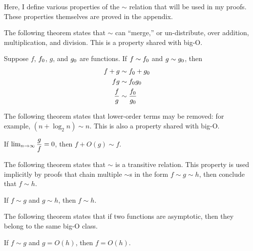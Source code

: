 Here, I define various properties of the $\sim$ relation that will be used in my proofs. These properties themselves are proved in the appendix.

The following theorem states that $\sim$ can ``merge,'' or un-distribute, over addition, multiplication, and division. This is a property shared with big-O.

\begin{theorem}
\label{thm:MergesOverOps}
	Suppose $f$, $f_0$, $g$, and $g_0$ are functions. If $f \sim f_0$ and $g \sim g_0$, then
	\begin{align*}
	f + g &\sim f_0 + g_0\\
	fg &\sim f_0g_0\\
	\frac{f}{g} &\sim \frac {f_0} {g_0}
	\end{align*}
\end{theorem}

The following theorem states that lower-order terms may be removed: for example, $(n + \log_2 n) \sim n$. This is also a property shared with big-O.

\begin{theorem}
\label{thm:RemovesLowerOrderTerms}
	If $\lim_{n \to \infty} \dfrac{g}{f} = 0$, then $f + O(g) \sim f$.
\end{theorem}

The following theorem states that $\sim$ is a transitive relation. This property is used implicitly by proofs that chain multiple $\sim$s in the form $f \sim g \sim h$, then conclude that $f \sim h$.

\begin{theorem}
\label{thm:SimIsTransitive}
	If $f \sim g$ and $g \sim h$, then $f \sim h$.
\end{theorem}

The following theorem states that if two functions are asymptotic, then they belong to the same big-O class.

\begin{theorem}
\label{thm:SameBigOClass}
	If $f \sim g$ and $g = O(h)$, then $f = O(h)$.
\end{theorem}